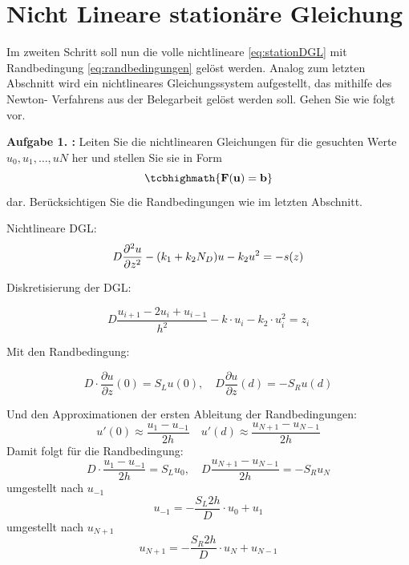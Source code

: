 \section{Nicht Lineare stationäre Gleichung}
\begin{mybox}
	Im zweiten Schritt soll nun die volle nichtlineare \cref{eq:stationDGL}
	mit Randbedingung \cref{eq:randbedingungen} gelöst werden. Analog
	zum letzten Abschnitt wird ein nichtlineares Gleichungssystem
	aufgestellt, das mithilfe des Newton-
	Verfahrens aus der Belegarbeit gelöst werden soll. Gehen Sie wie folgt
	vor.\cite{Prof.Dr.AndreasZeiser.April2021}
\end{mybox}

\begin{mybox}
	\textbf{Aufgabe 1. :} Leiten Sie die nichtlinearen Gleichungen für die
	gesuchten Werte $u_0,u_1,\dots ,uN$ her und stellen Sie
	sie in Form
	\begin{equation*}
		\tcbhighmath{\mathbf{F}(\mathbf{u})=\mathbf{b}}
	\end{equation*}
	dar. Berücksichtigen Sie die Randbedingungen wie im letzten Abschnitt.
	\cite{Prof.Dr.AndreasZeiser.April2021}
\end{mybox}
Nichtlineare DGL:
\begin{equation}
	D\pdv[2]{u}{z}-(k_1+k_2N_D)u-k_2u^2=-s(z)
\end{equation}

Diskretisierung der DGL:

\begin{equation}
	D\frac{u_{i+1}-2u_i+u_{i-1}}{h^2}-k\cdot u_i-k_2 \cdot u_i^2=z_i
\end{equation}

Mit den Randbedingung:

\begin{equation}
	D\cdot \frac{\partial u}{\partial z}(0)=S_Lu(0),\quad D\frac{\partial
		u}{\partial z}(d)=-S_Ru(d)
\end{equation}

Und den Approximationen der ersten Ableitung der  Randbedingungen:
\begin{equation}
	u'(0)\approx \frac{u_1-u_{-1}}{2h} \quad u'(d)\approx
	\frac{u_{N+1}-u_{N-1}}{2h}
\end{equation}
Damit folgt für die Randbedingung:
\begin{equation}
	D\cdot \frac{u_1-u_{-1}}{2h}=S_Lu_0,\quad
	D\frac{u_{N+1}-u_{N-1}}{2h}=-S_Ru_N
\end{equation}
umgestellt nach $u_{-1}$
\begin{equation}
	u_{-1}=-\frac{S_L 2h}{D}\cdot u_0+u_1
\end{equation}
umgestellt nach $u_{N+1}$
\begin{equation}
	u_{N+1}=-\frac{S_R2h}{D}\cdot u_N+u_{N-1}
\end{equation}


